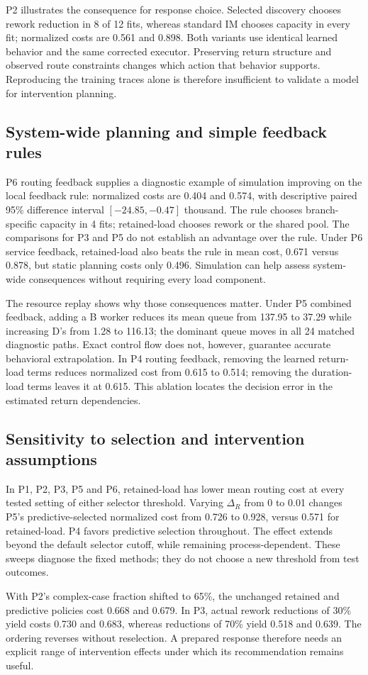 P2 illustrates the consequence for response choice. Selected discovery chooses rework reduction in 8 of 12 fits, whereas standard IM chooses capacity in every fit; normalized costs are 0.561 and 0.898. Both variants use identical learned behavior and the same corrected executor. Preserving return structure and observed route constraints changes which action that behavior supports. Reproducing the training traces alone is therefore insufficient to validate a model for intervention planning.

\subsection{System-wide planning and simple feedback rules}
P6 routing feedback supplies a diagnostic example of simulation improving on the local feedback rule: normalized costs are 0.404 and 0.574, with descriptive paired 95\% difference interval $[-24.85,-0.47]$ thousand. The rule chooses branch-specific capacity in 4 fits; retained-load chooses rework or the shared pool. The comparisons for P3 and P5 do not establish an advantage over the rule. Under P6 service feedback, retained-load also beats the rule in mean cost, 0.671 versus 0.878, but static planning costs only 0.496. Simulation can help assess system-wide consequences without requiring every load component.

The resource replay shows why those consequences matter. Under P5 combined feedback, adding a B worker reduces its mean queue from 137.95 to 37.29 while increasing D's from 1.28 to 116.13; the dominant queue moves in all 24 matched diagnostic paths. Exact control flow does not, however, guarantee accurate behavioral extrapolation. In P4 routing feedback, removing the learned return-load terms reduces normalized cost from 0.615 to 0.514; removing the duration-load terms leaves it at 0.615. This ablation locates the decision error in the estimated return dependencies.

\subsection{Sensitivity to selection and intervention assumptions}
In P1, P2, P3, P5 and P6, retained-load has lower mean routing cost at every tested setting of either selector threshold. Varying $\Delta_R$ from 0 to 0.01 changes P5's predictive-selected normalized cost from 0.726 to 0.928, versus 0.571 for retained-load. P4 favors predictive selection throughout. The effect extends beyond the default selector cutoff, while remaining process-dependent. These sweeps diagnose the fixed methods; they do not choose a new threshold from test outcomes.

With P2's complex-case fraction shifted to 65\%, the unchanged retained and predictive policies cost 0.668 and 0.679. In P3, actual rework reductions of 30\% yield costs 0.730 and 0.683, whereas reductions of 70\% yield 0.518 and 0.639. The ordering reverses without reselection. A prepared response therefore needs an explicit range of intervention effects under which its recommendation remains useful.

